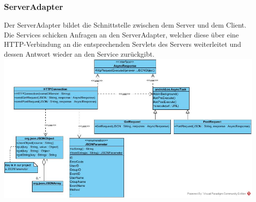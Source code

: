 	\subsubsection{ServerAdapter}
	Der ServerAdapter bildet die Schnittstelle zwischen dem Server und dem Client. Die Services schicken Anfragen an den ServerAdapter, welcher diese über eine HTTP-Verbindung an die entsprechenden Servlets des Servers weiterleitet und dessen Antwort wieder an den Service zurückgibt.
		\newline
		\includegraphics[width=1\textwidth]{HTTPClientClass Diagram.jpg}


	\newpage
